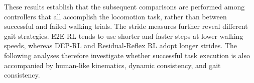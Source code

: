 \documentclass[acmtog,screen]{acmart}
\begin{document}
These results establish that the subsequent comparisons are performed among controllers that all accomplish the locomotion task, rather than between successful and failed walking trials. The stride measures further reveal different gait strategies. E2E-RL tends to use shorter and faster steps at lower walking speeds, whereas DEP-RL and Residual-Reflex RL adopt longer strides. The following analyses therefore investigate whether successful task execution is also accompanied by human-like kinematics, dynamic consistency, and gait consistency.

\begin{table}[!t]
\centering
\caption{Speed tracking and stride measures from the analyzed walking
trajectories. Speed error is the absolute difference between realized and target
speed.}
\label{tab:spatiotemporal_metrics}
\small
\setlength{\tabcolsep}{3.5pt}
\renewcommand{\arraystretch}{1.12}
\end{table}
\end{document}

